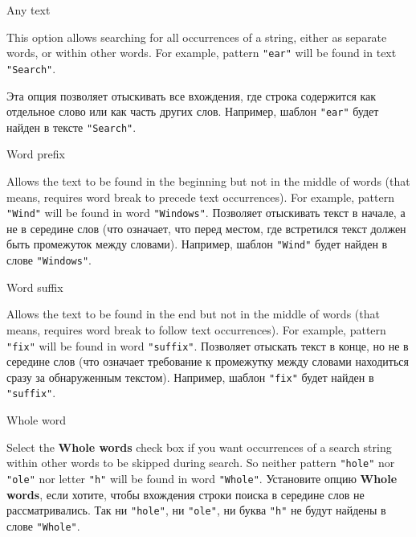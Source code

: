\begin{popup}
\caption{Any text}

\ifenglish
This option allows searching for all occurrences of a string, either
as separate words, or within other words. For example, pattern {\tt "ear"} will
be found in text {\tt "Search"}.

\else
Эта опция позволяет отыскивать все вхождения, где строка содержится как отдельное
слово или как часть других слов. Например, шаблон {\tt "ear"} будет
найден в тексте {\tt "Search"}.
\fi
\end{popup}

\begin{popup}
\caption{Word prefix}

\ifenglish
Allows the text to be found in the beginning but not in the middle of words
(that means, requires word break to precede text occurrences). For example,
pattern {\tt "Wind"} will be found in word {\tt"Windows"}.
\else
Позволяет отыскивать текст в начале, а не в середине слов (что означает, что
перед местом, где встретился текст должен быть промежуток между словами).
Например, шаблон {\tt "Wind"} будет найден в слове {\tt"Windows"}.
\fi
\end{popup}

\begin{popup}
\caption{Word suffix}

\ifenglish
Allows the text to be found in the end but not in the middle of words
(that means, requires word break to follow text occurrences). For example,
pattern {\tt "fix"} will be found in word {\tt"suffix"}.
\else
Позволяет отыскать текст в конце, но не в середине слов (что означает
требование к промежутку между словами находиться сразу за обнаруженным 
текстом). Например, шаблон {\tt "fix"} будет найден в {\tt"suffix"}.
\fi
\end{popup}

\begin{popup}
\caption{Whole word}

\ifenglish
Select the {\bf Whole words} check box if you want occurrences of a search
string within other words to be skipped during search.
So neither pattern {\tt "hole"} nor {\tt "ole"} nor letter {\tt "h"}
will be found in word {\tt "Whole"}.
\else
Установите опцию {\bf Whole words}, если хотите, чтобы вхождения строки поиска в 
середине слов не рассматривались. Так ни {\tt "hole"}, ни {\tt "ole"}, ни буква 
 {\tt "h"} не будут найдены в слове {\tt "Whole"}.
\fi
\end{popup}

